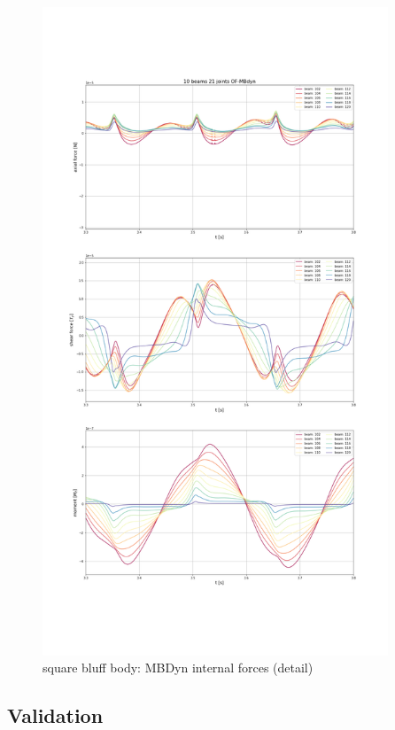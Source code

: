 \begin{figure}[htbp!]
	\centering
	\includegraphics[width=0.92\textwidth, trim=0 230 0 230, clip]{images/sq-cyl/sq-flap_OF-MBDyn_act.png}
	\caption{square bluff body: MBDyn internal forces (detail)}
	\label{fig:sq_mbd_internal}
\end{figure}

\newpage

\subsection{Validation}

